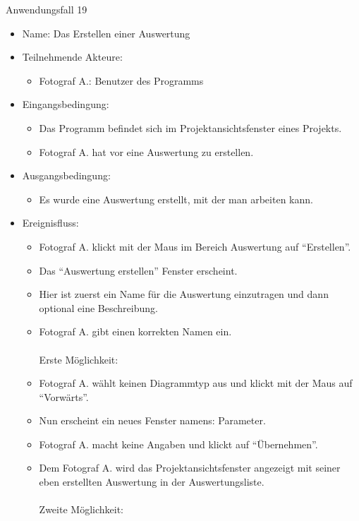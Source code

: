 	\begin{description}
		\item[Anwendungsfall 19]
	\end{description}
	
	\begin{itemize}
		\item Name: Das Erstellen einer Auswertung
		\item Teilnehmende Akteure:
		\begin{itemize}
			\item	Fotograf A.: Benutzer des Programms		
		\end{itemize}
		\item Eingangsbedingung:
		\begin{itemize}
			\item	Das Programm befindet sich im Projektansichtsfenster eines Projekts.
			\item Fotograf A. hat vor eine Auswertung zu erstellen.
		\end{itemize}
		\item Ausgangsbedingung:
		\begin{itemize}
			\item	Es wurde eine Auswertung erstellt, mit der man arbeiten kann.	
		\end{itemize}
		\item Ereignisfluss:
		\begin{itemize}
			\item Fotograf A. klickt mit der Maus im Bereich Auswertung auf "`Erstellen"'.
			\item Das "`Auswertung erstellen"' Fenster erscheint.
			\item Hier ist zuerst ein Name für die Auswertung einzutragen und dann optional eine Beschreibung.
			\item Fotograf A. gibt einen korrekten Namen ein.\\\\Erste Möglichkeit:\\
			\item Fotograf A. wählt keinen Diagrammtyp aus und klickt mit der Maus auf "`Vorwärts"'.
			\item Nun erscheint ein neues Fenster namens: Parameter.
			\item Fotograf A. macht keine Angaben und klickt auf "`Übernehmen"'.
			\item Dem Fotograf A. wird das Projektansichtsfenster angezeigt mit seiner eben erstellten Auswertung in der Auswertungsliste.\\\\Zweite Möglichkeit:\\		

\end{itemize}
\end{itemize}
